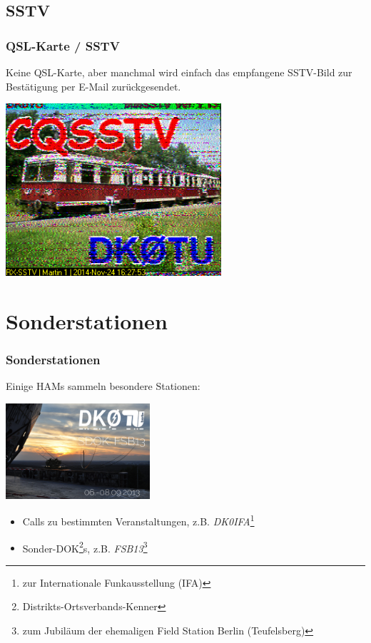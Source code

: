\subsection{SSTV}

\begin{frame}
    \frametitle{QSL-Karte / SSTV}

	Keine QSL-Karte, aber manchmal wird einfach das empfangene SSTV-Bild zur
	Bestätigung per E-Mail zurückgesendet.

    \begin{center}
        \includegraphics[width=0.6\textwidth]{bv13/QSL_SSTV_2014-11-24_162753.png}
    \end{center}

\end{frame}

\section{Sonderstationen}

\begin{frame}
    \frametitle{Sonderstationen}

    Einige HAMs sammeln besondere Stationen:

    \begin{center}
		\includegraphics[width=0.4\textwidth]{bv13/DK0TU_SDOK_FSB13.jpg}
    \end{center}

    \begin{itemize}
        \item Calls zu bestimmten Veranstaltungen, z.B.
              \emph{DK0IFA}\footnote{zur Internationale Funkausstellung (IFA)}
        \item Sonder-DOK\footnote{Distrikts-Ortsverbands-Kenner}s, z.B.
              \emph{FSB13}\footnote{zum Jubiläum der ehemaligen Field Station
              Berlin (Teufelsberg)}
    \end{itemize}

\end{frame}

